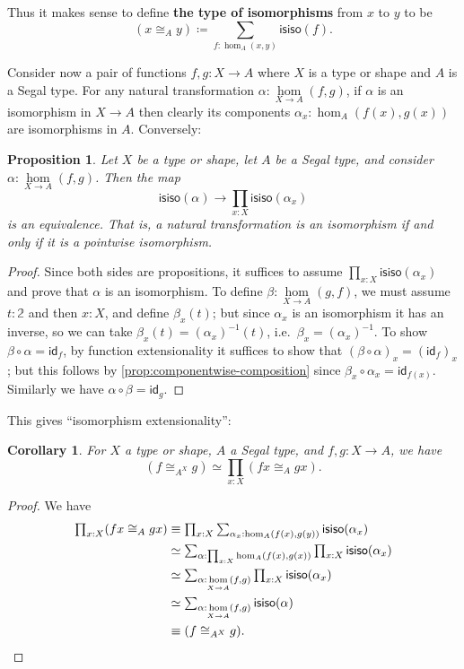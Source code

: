 \documentclass[12pt]{amsart}
\theoremstyle{plain}
\newtheorem{cor}[thm]{Corollary}
\newtheorem{prop}[thm]{Proposition}
\theoremstyle{definition}
\theoremstyle{remark}
\numberwithin{equation}{section}
\newcommand{\tprod}{\textstyle\prod}
\newcommand{\tsum}{\textstyle\sum}
\newcommand{\jdeq}{\equiv}
\newcommand{\defeq}{\coloneqq}
\def\nat#1#2{\underset{#1\to#2}{\hom}}
\newcommand{\two}{\mathbb{2}}
\newcommand{\idarr}[1]{\mathsf{id}_{#1}}
\newcommand{\isiso}[1]{\mathsf{isiso}(#1)}
\begin{document}
Thus it makes sense to define \textbf{the type of isomorphisms} from $x$ to $y$ to be
\[ (x\cong_A y) \defeq \sum_{f:\hom_A(x,y)}\isiso f. \]

Consider now a pair of functions $f,g : X \to A$ where $X$ is a type or shape and $A$ is a Segal type. For any natural transformation $\alpha : \nat XA(f,g)$, if $\alpha$ is an isomorphism in $X \to A$ then clearly its components $\alpha_x : \hom_A(f(x),g(x))$ are isomorphisms in $A$. Conversely:

\begin{prop} Let $X$ be a type or shape, let $A$ be a Segal type, and consider $\alpha : \nat XA(f,g)$. Then the map
\[ \isiso \alpha \to \prod_{x : X} \isiso {\alpha_x}\] is an equivalence. That is, a natural transformation is an isomorphism if and only if it is a pointwise isomorphism. 
\end{prop}
\begin{proof}
  Since both sides are propositions, it suffices to assume $\prod_{x : X} \isiso {\alpha_x}$ and prove that $\alpha$ is an isomorphism.
  To define $\beta:\nat XA(g,f)$, we must assume $t:\two$ and then $x:X$, and define $\beta_x(t)$; but since $\alpha_x$ is an isomorphism it has an inverse, so we can take $\beta_x(t) = (\alpha_x)^{-1}(t)$, i.e.\ $\beta_x = (\alpha_x)^{-1}$.
  To show $\beta\circ\alpha = \idarr f$, by function extensionality it suffices to show that $(\beta \circ \alpha)_x = (\idarr f)_x$; but this follows by \cref{prop:componentwise-composition} since $\beta_x \circ \alpha_x = \idarr{f(x)}$.
  Similarly we have $\alpha\circ\beta = \idarr g$.
\end{proof}

This gives ``isomorphism extensionality'':

\begin{cor}\label{thm:isomorphism-extensionality}
  For $X$ a type or shape, $A$ a Segal type, and $f,g: X\to A$, we have
  \[ (f \cong_{A^X} g) \simeq \prod_{x :X} (fx \cong_A gx).\]
\end{cor}
\begin{proof}
  We have
  \begin{align*}
    \tprod_{x :X} (fx \cong_A gx)
    &\jdeq \tprod_{x :X} \sum_{\alpha_x:\hom_A(f(x),g(y))} \isiso {\alpha_x}\\
    &\simeq \tsum_{\alpha:\prod_{x:X}\hom_A(f(x),g(x))} \tprod_{x:X} \isiso {\alpha_x}\\
    &\simeq \tsum_{\alpha:\nat XA(f,g)} \tprod_{x:X} \isiso {\alpha_x}\\
    &\simeq  \tsum_{\alpha:\nat XA(f,g)} \isiso{\alpha}\\
    &\jdeq (f\cong_{A^X} g).\qedhere
  \end{align*}
\end{proof}
\end{document}
